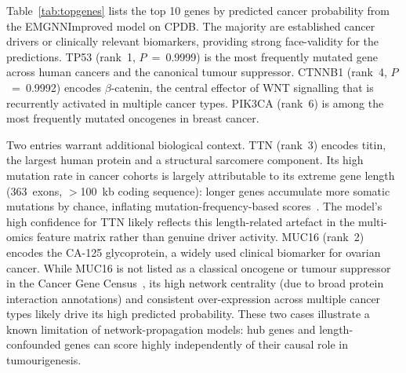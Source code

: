 Table~\ref{tab:topgenes} lists the top 10 genes by predicted cancer probability from
the EMGNNImproved model on CPDB. The majority are established cancer drivers or
clinically relevant biomarkers, providing strong face-validity for the predictions.
TP53 (rank~1, $P$~=~0.9999) is the most frequently mutated gene across human cancers and
the canonical tumour suppressor. CTNNB1 (rank~4, $P$~=~0.9992) encodes $\beta$-catenin,
the central effector of WNT signalling that is recurrently activated in multiple cancer
types. PIK3CA (rank~6) is among the most frequently mutated oncogenes in breast cancer.

Two entries warrant additional biological context. TTN (rank~3) encodes titin, the
largest human protein and a structural sarcomere component. Its high mutation rate in
cancer cohorts is largely attributable to its extreme gene length (363~exons, $>$100~kb
coding sequence): longer genes accumulate more somatic mutations by chance, inflating
mutation-frequency-based scores~\cite{lawrence2013}. The model's high confidence for
TTN likely reflects this length-related artefact in the multi-omics feature matrix rather
than genuine driver activity. MUC16 (rank~2) encodes the CA-125 glycoprotein, a widely
used clinical biomarker for ovarian cancer. While MUC16 is not listed as a classical
oncogene or tumour suppressor in the Cancer Gene Census~\cite{cgc2022}, its high network
centrality (due to broad protein interaction annotations) and consistent over-expression
across multiple cancer types likely drive its high predicted probability. These two cases
illustrate a known limitation of network-propagation models: hub genes and
length-confounded genes can score highly independently of their causal role in
tumourigenesis.

